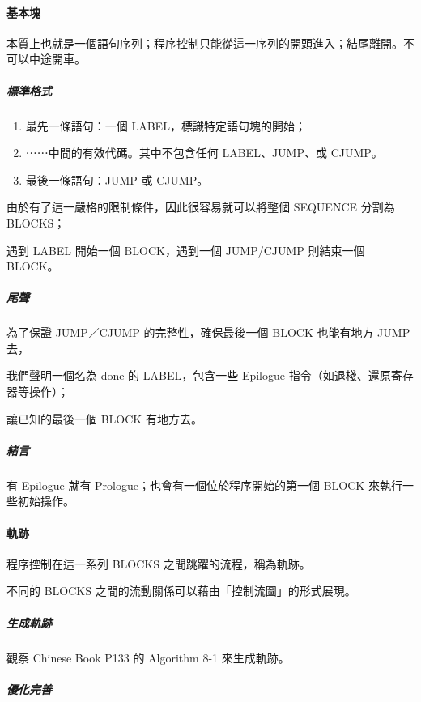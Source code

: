\documentclass[
]{article}
\begin{document}
\hypertarget{header-n244}{%
\paragraph{基本塊}\label{header-n244}}

本質上也就是一個語句序列；程序控制只能從這一序列的開頭進入；結尾離開。不可以中途開車。

\hypertarget{header-n246}{%
\subparagraph{標準格式}\label{header-n246}}

\begin{enumerate}
\def\labelenumi{\arabic{enumi}.}
\item
  最先一條語句：一個 LABEL，標識特定語句塊的開始；
\item
  ⋯⋯中間的有效代碼。其中不包含任何 LABEL、JUMP、或 CJUMP。
\item
  最後一條語句：JUMP 或 CJUMP。
\end{enumerate}

由於有了這一嚴格的限制條件，因此很容易就可以將整個 SEQUENCE 分割為
BLOCKS；

遇到 LABEL 開始一個 BLOCK，遇到一個 JUMP/CJUMP 則結束一個 BLOCK。

\hypertarget{header-n256}{%
\subparagraph{尾聲}\label{header-n256}}

為了保證 JUMP／CJUMP 的完整性，確保最後一個 BLOCK 也能有地方 JUMP 去，

我們聲明一個名為 done 的 LABEL，包含一些 Epilogue
指令（如退棧、還原寄存器等操作）；

讓已知的最後一個 BLOCK 有地方去。

\hypertarget{header-n260}{%
\subparagraph{緒言}\label{header-n260}}

有 Epilogue 就有 Prologue；也會有一個位於程序開始的第一個 BLOCK
來執行一些初始操作。

\hypertarget{header-n262}{%
\paragraph{軌跡}\label{header-n262}}

程序控制在這一系列 BLOCKS 之間跳躍的流程，稱為軌跡。

不同的 BLOCKS 之間的流動關係可以藉由「控制流圖」的形式展現。

\hypertarget{header-n265}{%
\subparagraph{生成軌跡}\label{header-n265}}

觀察 Chinese Book P133 的 Algorithm 8-1 來生成軌跡。

\hypertarget{header-n267}{%
\subparagraph{優化完善}\label{header-n267}}
\end{document}
